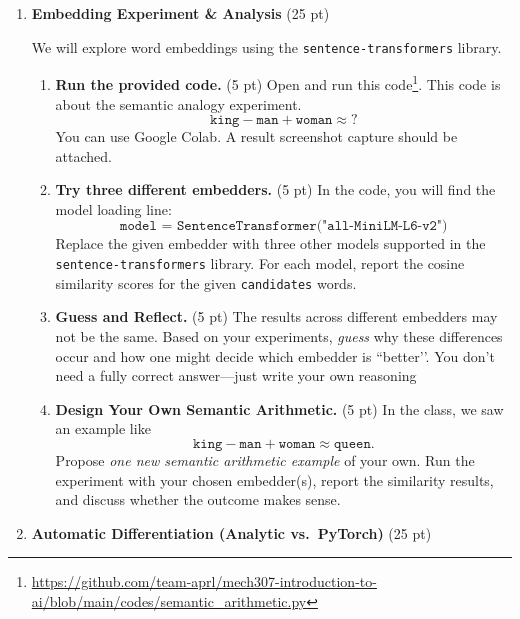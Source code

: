 \documentclass[12pt]{article}
\begin{document}
\begin{enumerate}[label=\textbf{Q\arabic*.}]

\item \textbf{Embedding Experiment \& Analysis} (25 pt)

We will explore word embeddings using the \texttt{sentence-transformers} library.

\begin{enumerate}[label=(\alph*)]

    \item \textbf{Run the provided code.} (5 pt)  
    Open and run this code\footnote{\url{https://github.com/team-aprl/mech307-introduction-to-ai/blob/main/codes/semantic_arithmetic.py}}. This code is about the semantic analogy experiment.
    \[
        \texttt{king} - \texttt{man} + \texttt{woman} \approx ?
    \]
    You can use Google Colab. A result screenshot capture should be attached. 
 
    \item \textbf{Try three different embedders.} (5 pt)  
    In the code, you will find the model loading line:
    \[
        \texttt{model = SentenceTransformer("all-MiniLM-L6-v2")}
    \]
    Replace the given embedder with three other models supported in the \\ \texttt{sentence-transformers} library.  
    For each model, report the cosine similarity scores for the given \texttt{candidates} words.   

    \item \textbf{Guess and Reflect.} (5 pt)  
    The results across different embedders may not be the same.  
    Based on your experiments, \emph{guess} why these differences occur and how one might decide which embedder is ``better’’. You don’t need a fully correct answer—just write your own reasoning

    \item \textbf{Design Your Own Semantic Arithmetic.} (5 pt)  
    In the class, we saw an example like
    \[
        \texttt{king} - \texttt{man} + \texttt{woman} \approx \texttt{queen}.
    \]
    Propose \emph{one new semantic arithmetic example} of your own.  
    Run the experiment with your chosen embedder(s), report the similarity results, and discuss whether the outcome makes sense.

\end{enumerate}


\item \textbf{Automatic Differentiation (Analytic vs.\ PyTorch)} (25 pt)


\end{enumerate}
\end{document}
